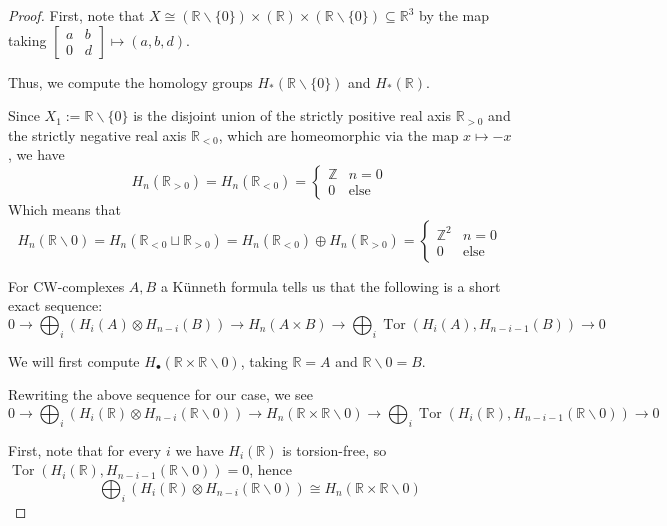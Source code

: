 \documentclass{article}
\DeclareMathOperator{\Tor}{Tor}
\begin{document}
\begin{enumerate}
	\begin{proof}
		First, note that $X \cong (\mathbb{R} \backslash \{0\}) \times (\mathbb{R}) \times (\mathbb{R} \backslash \{0\})\subseteq \mathbb{R}^3$ by the map taking $\begin{bmatrix} a & b \\ 0 & d \end{bmatrix} \mapsto (a,b,d)$.
		
		Thus, we compute the homology groups $H_*(\mathbb{R} \backslash \{0\})$ and $H_*(\mathbb{R})$.
		
		Since $X_1 := \mathbb{R} \backslash \{0\}$ is the disjoint union of the strictly positive real axis $\mathbb{R}_{> 0}$ and the strictly negative real axis $\mathbb{R}_{< 0}$, which are homeomorphic via the map $x \mapsto -x$,
		we have 
		\[H_n(\mathbb{R}_{> 0}) = H_n(\mathbb{R}_{< 0}) = \begin{cases} \mathbb{Z} &n=0 \\ 0 &\text{else}  \end{cases} \]
		Which means that
		\[H_n(\mathbb{R} \backslash 0) = H_n(\mathbb{R}_{< 0}\sqcup \mathbb{R}_{> 0} ) = H_n(\mathbb{R}_{< 0}) \oplus H_n(\mathbb{R}_{> 0} )  = \begin{cases} \mathbb{Z}^2 & n=0 \\ 0 & \text{else} \end{cases}\]
		
		
		For CW-complexes $A,B$ a K\"unneth formula tells us that the following is a short exact sequence:
		\begin{equation} 0 \rightarrow \bigoplus_i \left ( H_i(A) \otimes H_{n-i}(B) \right ) \rightarrow H_n(A\times B) \rightarrow
		\bigoplus_i \Tor \left ( H_i(A), H_{n-i-1}(B) \right ) \rightarrow 0 \label{seq:Kunneth}\end{equation}
		
		We will first compute $H_\bullet (\mathbb{R} \times \mathbb{R}\backslash 0)$, taking $\mathbb{R} = A$ and $\mathbb{R}\backslash 0 = B$.
		
		Rewriting the above sequence for our case, we see 
		\[ 0 \rightarrow \bigoplus_i \left ( H_i(\mathbb{R}) \otimes H_{n-i}(\mathbb{R}\backslash 0) \right ) \rightarrow H_n(\mathbb{R}\times \mathbb{R}\backslash 0) \rightarrow
		\bigoplus_i \Tor \left ( H_i(\mathbb{R}), H_{n-i-1}(\mathbb{R}\backslash 0) \right ) \rightarrow 0\]
		
		First, note that for every $i$ we have $H_i(\mathbb{R})$ is torsion-free, so $\Tor \left ( H_i(\mathbb{R}), H_{n-i-1}(\mathbb{R}\backslash 0) \right ) = 0$, hence
		\[ \bigoplus_i \left ( H_i(\mathbb{R}) \otimes H_{n-i}(\mathbb{R}\backslash 0) \right ) \cong H_n(\mathbb{R}\times \mathbb{R}\backslash 0) \]
		

\end{proof}
\end{enumerate}
\end{document}
